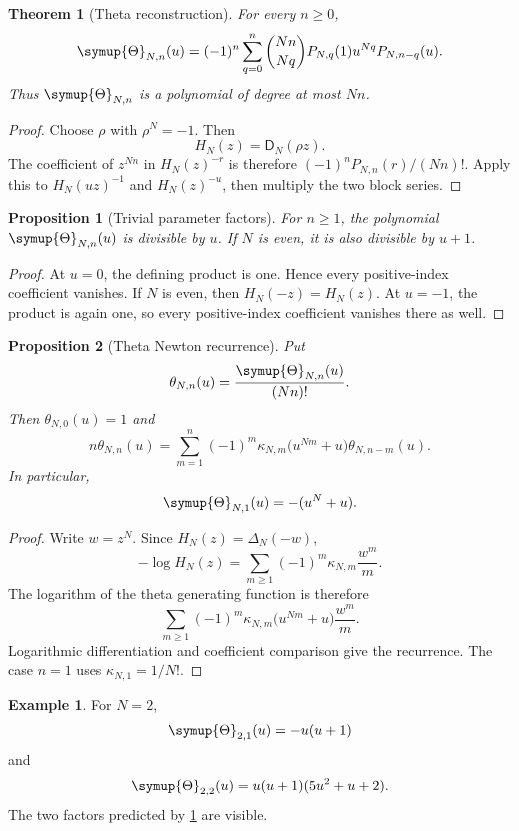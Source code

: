 \documentclass[11pt,letterpaper]{article}
\newtheorem{theorem}{Theorem}[section]
\newtheorem{proposition}[proposition]{Proposition}
\theoremstyle{definition}
\newtheorem{example}[example]{Example}
\theoremstyle{remark}
\newcommand{\Dfun}{\mathsf D}
\newcommand{\Thetafun}{\symup{\Theta}}
\begin{document}
\begin{theorem}[Theta reconstruction]\label{thm:theta_reconstruction}
For every $n\geq0$,
\[
\Thetafun_{N,n}(u)
=
(-1)^n
\sum_{q=0}^{n}
\binom{Nn}{Nq}
P_{N,q}(1)u^{Nq}P_{N,n-q}(u).
\]
Thus $\Thetafun_{N,n}$ is a polynomial of degree at most $Nn$.
\end{theorem}

\begin{proof}
Choose $\rho$ with $\rho^N=-1$.  Then
\[
H_N(z)=\Dfun_N(\rho z).
\]
The coefficient of $z^{Nn}$ in $H_N(z)^{-r}$ is therefore $(-1)^nP_{N,n}(r)/(Nn)!$.  Apply this to $H_N(uz)^{-1}$ and $H_N(z)^{-u}$, then multiply the two block series.
\end{proof}

\begin{proposition}[Trivial parameter factors]\label{prop:theta_factors}
For $n\geq1$, the polynomial $\Thetafun_{N,n}(u)$ is divisible by $u$.  If $N$ is even, it is also divisible by $u+1$.
\end{proposition}

\begin{proof}
At $u=0$, the defining product is one.  Hence every positive-index coefficient vanishes.  If $N$ is even, then $H_N(-z)=H_N(z)$.  At $u=-1$, the product is again one, so every positive-index coefficient vanishes there as well.
\end{proof}


\begin{proposition}[Theta Newton recurrence]\label{prop:theta_newton_recurrence}
Put
\[
\theta_{N,n}(u)=\frac{\Thetafun_{N,n}(u)}{(Nn)!}.
\]
Then $\theta_{N,0}(u)=1$ and
\[
n\theta_{N,n}(u)
=
\sum_{m=1}^{n}
(-1)^m\kappa_{N,m}
\bigl(u^{Nm}+u\bigr)
\theta_{N,n-m}(u).
\]
In particular,
\[
\Thetafun_{N,1}(u)=-(u^N+u).
\]
\end{proposition}

\begin{proof}
Write $w=z^N$.  Since $H_N(z)=\Delta_N(-w)$,
\[
-\log H_N(z)
=
\sum_{m\geq1}(-1)^m\kappa_{N,m}\frac{w^m}{m}.
\]
The logarithm of the theta generating function is therefore
\[
\sum_{m\geq1}
(-1)^m\kappa_{N,m}
\bigl(u^{Nm}+u\bigr)
\frac{w^m}{m}.
\]
Logarithmic differentiation and coefficient comparison give the recurrence.  The case $n=1$ uses $\kappa_{N,1}=1/N!$.
\end{proof}

\begin{example}\label{ex:theta_even}
For $N=2$,
\[
\Thetafun_{2,1}(u)=-u(u+1)
\]
and
\[
\Thetafun_{2,2}(u)
=
u(u+1)(5u^2+u+2).
\]
The two factors predicted by \cref{prop:theta_factors} are visible.
\end{example}
\end{document}
